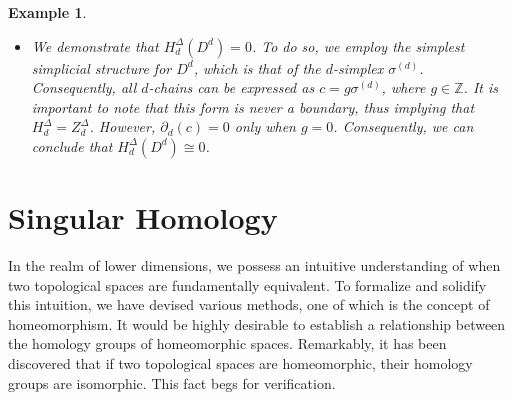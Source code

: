 \documentclass{amsart}
\newtheorem{example}[definition]{Example}
\begin{document}
\begin{example}
\begin{itemize}
	\begin{equation}
	\label{chain}
	c = \sum_{i=0}^{d+1}g_i (v_0,\ldots,v_{i-1},v_{i+1},\ldots,v_d),
	\end{equation}
	where $g_i \in \mathbb{Z}$. Since $\sigma^{(d+1)}$ itself is not part of the structure, there are no boundaries in $Z^\Delta_d$, the group of simplicial cycles. Therefore, $H^\Delta_d = Z\Delta_d/B^\Delta_d$ represents the group of simplicial cycles. If $c \in Z^\Delta_d$, then $\partial_{d+1}(c) = 0$. By using Eq. \ref{chain}, we have:
	\begin{align} \partial_{d+1}(c) = &\partial_{d+1}\left(\sum_{i=0}^{d+1} g_i(v_0,\ldots,v_{i-1},v_{i+1},\ldots,v_d) \right) \\ = &\sum_{i=0}^{d+1}g_i \big(\sum_{j1}^{d+1}(-1)^j(v_0,\ldots,v_{i-1},v_{i+1},\ldots,v_{j-1},v_{j+1},\ldots,v_d)\big). \end{align}
	By rearranging this sum, we obtain terms of the form:
	\begin{equation} \label{terms} (g_k-g_l)(v_0,\ldots,v_{j-1},v_{j+1},\ldots,v_{i-1},v_{i+1},\ldots,v_d) \end{equation}
	where $k,l = 0, \ldots, d+1$ for all $i,j = 0, \ldots, d$. Each pair of $d$-simplices of $\sigma^{(d+1)}$ intersect along an $(d-1)$-face. Therefore, we obtain terms of the form given in Eq. \ref{terms} for each of these faces. From this, we can deduce that if $\partial_{d}(c) = 0$, we must have $g_k = g_l$ for all $k,l = 0, \ldots, d+1$. In other words, $g_0 = g_1 = \cdots = g_{d+1}$. Consequently, our original $d$-chain can be rewritten as:
	\begin{equation} c = \sum_{i=0}^{n+1}g_0(v_0,\ldots,v_{i-1},v_{i+1},\ldots,v_d), \end{equation}
	allowing us to choose $g_0$ from $\mathbb{Z}$. Thus, we conclude that $H^\Delta_d(S^d) \cong \mathbb{Z}$.
	\item We demonstrate that $H^\Delta_d(D^d) = 0$. To do so, we employ the simplest simplicial structure for $D^d$, which is that of the $d$-simplex $\sigma^{(d)}$. Consequently, all $d$-chains can be expressed as $c = g \sigma^{(d)}$, where $g \in \mathbb{Z}$. It is important to note that this form is never a boundary, thus implying that $H^\Delta_d = Z^\Delta_d$. However, $\partial_d(c) = 0$ only when $g = 0$. Consequently, we can conclude that $H^\Delta_d(D^d) \cong 0$.
\end{itemize}
\end{example}

\section{Singular Homology}
In the realm of lower dimensions, we possess an intuitive understanding of when two topological spaces are fundamentally \glqq equivalent\grqq{}. To formalize and solidify this intuition, we have devised various methods, one of which is the concept of homeomorphism. It would be highly desirable to establish a relationship between the homology groups of homeomorphic spaces. Remarkably, it has been discovered that if two topological spaces are homeomorphic, their homology groups are isomorphic. This fact begs for verification.
\end{document}
